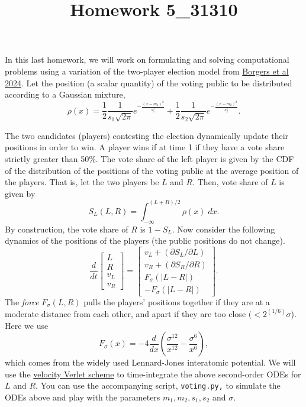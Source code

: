 \documentclass[12pt]{article}
\title{Homework 5_31310}
\begin{document}
\MakeScribeTop
In this last homework, we will work on formulating and solving computational problems using a variation of the  
two-player election model from \href{https://scholarship.claremont.edu/codee/vol17/iss1/11/}{Borgers et al 2024}.
Let the position (a scalar quantity) of the voting public to be distributed according to a Gaussian mixture,
$$\rho(x) = \dfrac{1}{2} \dfrac{1}{s_1 \sqrt{2\pi}} e^{-\frac{(x - m_1)^2}{s_1^2}} + \dfrac{1}{2} \dfrac{1}{s_2 \sqrt{2\pi}} e^{-\frac{(x - m_2)^2}{s_2^2}}.$$ 

The two candidates (players) contesting the election dynamically update their positions in order 
to win. A player wins if at time 1 if they have a vote share strictly greater than 50\%.
The vote share of the left player is given by the CDF of the distribution of the positions of the voting public at 
the average position of the players.
That is, let the two players be $L$ and $R$. 
Then, vote share of $L$ is given by 
$$S_L(L, R) = \int_{-\infty}^{(L+R)/2} \rho(x) \; dx.$$
By construction, the vote share of $R$ is $1 - S_L.$
Now consider the following dynamics of the positions of the players (the public positions do not change).
\begin{equation}
	\dfrac{d}{dt} \begin{bmatrix}
		L \\
		R \\
		v_L \\
		v_R 
	\end{bmatrix} = \begin{bmatrix}
	v_L + (\partial S_L/\partial L)\\
	v_R  + (\partial S_R/\partial R)\\
	F_\sigma(|L - R|) \\
	-F_\sigma(|L - R|)
	\end{bmatrix}.  
\end{equation}
The \emph{force} $F_\sigma(L,R)$ pulls the players' positions together if they are at a moderate distance from each other, and apart if they are too close $(< 2^{(1/6)} \sigma$).
Here we use 
$$F_\sigma(x) = -4\dfrac{d}{dx}\left(\dfrac{\sigma^{12}}{x^{12}} - \dfrac{\sigma^6}{x^{6}}\right),$$
which comes from the widely used Lennard-Jones interatomic potential. 
We will use the \href{https://en.wikipedia.org/wiki/Verlet_integration}{velocity Verlet scheme} to time-integrate the above second-order ODEs for $L$ and $R.$ You can use the accompanying script, \verb+voting.py,+ to simulate 
the ODEs above and play with the parameters $m_1, m_2, s_1, s_2$ and $\sigma.$
 
\end{document}
